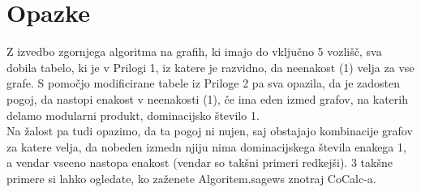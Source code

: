 \documentclass[a4paper,12pt]{article}
\begin{document}
\section{Opazke}
Z izvedbo zgornjega algoritma na grafih, ki imajo do vključno 5 vozlišč, sva dobila tabelo, ki je v Prilogi 1, iz katere je razvidno, da neenakost (1) velja za vse grafe.
S pomočjo modificirane tabele iz Priloge 2 pa sva opazila, da je zadosten pogoj, da nastopi enakost v neenakosti (1), če ima eden izmed grafov, na katerih delamo modularni produkt,
dominacijsko število 1. \\

Na žalost pa tudi opazimo, da ta pogoj ni nujen, saj obstajajo kombinacije grafov za katere velja, da nobeden izmedn njiju nima dominacijskega števila enakega 1,
a vendar vseeno nastopa enakost (vendar so takšni primeri redkejši). 3 takšne primere si lahko ogledate, ko zaženete Algoritem.sagews znotraj CoCalc-a.
\end{document}
